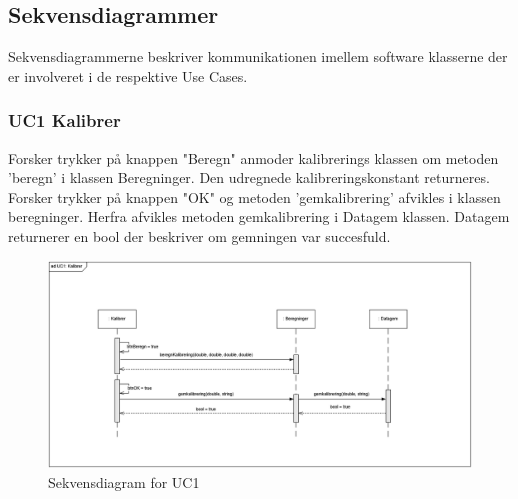 \subsection{Sekvensdiagrammer}
Sekvensdiagrammerne beskriver kommunikationen imellem software klasserne der er involveret i de respektive Use Cases.\\

\subsubsection{UC1 Kalibrer}
Forsker trykker på knappen "Beregn" anmoder kalibrerings klassen om metoden 'beregn' i klassen Beregninger. Den udregnede kalibreringskonstant returneres.\\
Forsker trykker på knappen "OK" og metoden 'gemkalibrering' afvikles i klassen beregninger. Herfra afvikles metoden gemkalibrering i Datagem klassen. Datagem returnerer en bool der beskriver om gemningen var succesfuld.
\begin{figure}[H]
	\centering
	\includegraphics[width=1\textwidth]{Figurer/UC1_SD_SW}
	\caption{Sekvensdiagram for UC1}
\end{figure}

